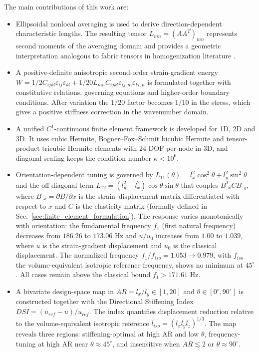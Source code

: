 \documentclass[final,3p,times,fleqn]{elsarticle}
\newcommand{\revtwo}[1]{\textcolor{revtwocolor}{#1}}
\begin{document}
The main contributions of this work are:
\begin{itemize}
  \item Ellipsoidal nonlocal averaging is used to derive direction-dependent characteristic lengths. The resulting tensor $L_{mn}=(AA^T)_{mn}$ represents second moments of the averaging domain and provides a geometric interpretation analogous to fabric tensors in homogenization literature \cite{LazarPo2015,Polizzotto2018,Auffray2019}.
  \item A positive-definite anisotropic second-order strain-gradient energy $W=1/2 C_{ijkl}\varepsilon_{ij}\varepsilon_{kl}+1/20 L_{mn}C_{ijkl}\varepsilon_{ij,m}\varepsilon_{kl,n}$ is formulated together with constitutive relations, governing equations and higher-order boundary conditions. After variation the $1/20$ factor becomes $1/10$ in the stress, which gives a positive stiffness correction in the wavenumber domain.
  \item A unified $C^{1}$-continuous finite element framework is developed for 1D, 2D and 3D. It uses cubic Hermite, Bogner--Fox--Schmit bicubic Hermite and tensor-product tricubic Hermite elements with 24 DOF per node in 3D, and diagonal scaling keeps the condition number $\kappa<10^6$.
  \item Orientation-dependent tuning is governed by $L_{11}(\theta)=l_x^2\cos^2\theta+l_y^2\sin^2\theta$ and the off-diagonal term $L_{12}=(l_y^2-l_x^2)\cos\theta\sin\theta$ that couples $B_{,x}^T C B_{,y}$, where $B_{,x}=\partial B/\partial x$ is the strain--displacement matrix differentiated with respect to $x$ and $C$ is the elasticity matrix (formally defined in Sec.~\revtwo{\ref{sec:finite_element_formulation}}). The response varies monotonically with orientation: the fundamental frequency $f_1$ (first natural frequency) decreases from $186.26$ to $173.06$ Hz and $u/u_0$ increases from $1.00$ to $1.039$, where $u$ is the strain-gradient displacement and $u_0$ is the classical displacement. The normalized frequency $f_1/f_{iso}=1.053\to0.979$, with $f_{iso}$ the volume-equivalent isotropic reference frequency, shows no minimum at $45^\circ$. All cases remain above the classical bound $f_1>171.61$ Hz.
  \item A bivariate design-space map in $AR=l_x/l_y\in[1,20]$ and $\theta\in[0^\circ,90^\circ]$ is constructed together with the Directional Stiffening Index $DSI=(u_{ref}-u)/u_{ref}$. The index quantifies displacement reduction relative to the volume-equivalent isotropic reference $l_{iso}=(l_xl_yl_z)^{1/3}$. The map reveals three regions: stiffening-optimal at high AR and low $\theta$, frequency-tuning at high AR near $\theta\approx45^\circ$, and insensitive when $AR\lesssim2$ or $\theta\approx90^\circ$.
\end{itemize}
\end{document}
